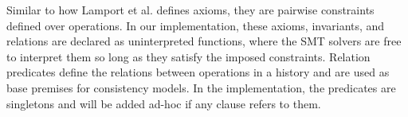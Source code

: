 %
%
%

%
%

Similar to how Lamport et al. \cite{lamport1977proving} defines
axioms, they are pairwise constraints defined over operations. In
our implementation, these axioms, invariants, and relations are
declared as uninterpreted functions, where the SMT solvers are free
to interpret them so long as they satisfy the imposed constraints.
{\color{red}Relation predicates define the relations between
  operations in a history and are used as base premises for consistency
  models. In the implementation, the predicates are singletons and will
be added ad-hoc if any clause refers to them.}

